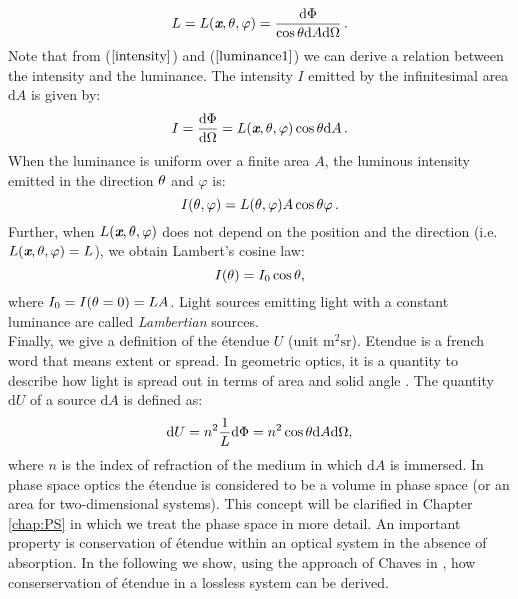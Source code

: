 \begin{equation}\label{luminance1}
  L=L(\textit{\textbf{x}}, \theta, \varphi) = \frac{\textrm{d}\Phi}{\cos\theta\textrm{d}A\textrm{d}\Omega}\,.
\end{equation}
\noindent Note that from ($\ref{intensity}$) and ($\ref{luminance1}$) we can derive a relation between the intensity and the luminance. 
The intensity $I$ emitted by the infinitesimal area $\textrm{d}A$ is given by:
\begin{equation}\label{eq:int_lum}
I = \frac{\textrm{d}\Phi}{\textrm{d}\Omega}= L(\textit{\textbf{x}},\theta, \varphi)\cos\theta\textrm{d}A \,.
\end{equation}
When the luminance is uniform over a finite area $A$, the luminous intensity emitted in the direction $\theta$ and $\varphi$ is:
\begin{equation}
I(\theta, \varphi) = L(\theta, \varphi) A \cos\theta\varphi\,.
\end{equation}
Further, when $L(\textit{\textbf{x}},\theta, \varphi)$ does not depend on the position and the direction (i.e. $L(\textit{\textbf{x}},\theta, \varphi)=L$), we obtain Lambert's cosine law:
\begin{equation}
I(\theta) = I_0\cos\theta ,
\end{equation}
where $I_0 = I(\theta = 0) = LA$. Light sources emitting light with a constant luminance are called \textit{Lambertian} sources.\\
\indent Finally, we give a definition of the \'{e}tendue $U$ (unit $\textrm{m}^2\textrm{sr}$).
Etendue is a french word that means extent or spread. In geometric optics, it is a quantity to describe how light is spread out in terms of area and solid angle \cite{lerner2006etendue, zhu2011etendue}.
The quantity $ \textrm{d}U $ of a source $\textrm{d}A$ is defined as:
\begin{equation}\label{etendue}
\textrm{d}U = n^2  \frac{1}{L}\textrm{d}\Phi = n^2 \cos\theta\textrm{d}A\textrm{d}\Omega,
\end{equation}
where $n$ is the index of refraction of the medium in which $\textrm{d}A$ is immersed. In phase space optics the \'{e}tendue is considered to be a volume in phase space (or an area for two-dimensional systems). This concept will be clarified in Chapter \ref{chap:PS} in which we treat the phase space in more detail.
An important property is conservation of \'{e}tendue within an optical system in the absence of absorption. 
In the following we show, using the approach of Chaves in \cite{chaves2015introduction}, 
how conserservation of \'{e}tendue in a lossless system can be derived. 
